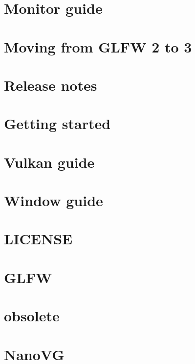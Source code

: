 \let\mypdfximage\pdfximage\def\pdfximage{\immediate\mypdfximage}\documentclass[twoside]{book}
\newcommand{\+}{\discretionary{\mbox{\scriptsize$\hookleftarrow$}}{}{}}
\begin{document}
\chapter{Monitor guide}
\label{monitor_guide}

\chapter{Moving from G\+L\+FW 2 to 3}
\label{moving_guide}

\chapter{Release notes}
\label{news}

\chapter{Getting started}
\label{quick_guide}

\chapter{Vulkan guide}
\label{vulkan_guide}

\chapter{Window guide}
\label{window_guide}

\chapter{L\+I\+C\+E\+N\+SE}
\label{md_ext_nanogui_ext_glfw_LICENSE}

\chapter{G\+L\+FW}
\label{md_ext_nanogui_ext_glfw_README}

\chapter{obsolete}
\label{md_ext_nanogui_ext_nanovg_obsolete_obsolete}

\chapter{Nano\+VG}
\label{md_ext_nanogui_ext_nanovg_README}

\end{document}

